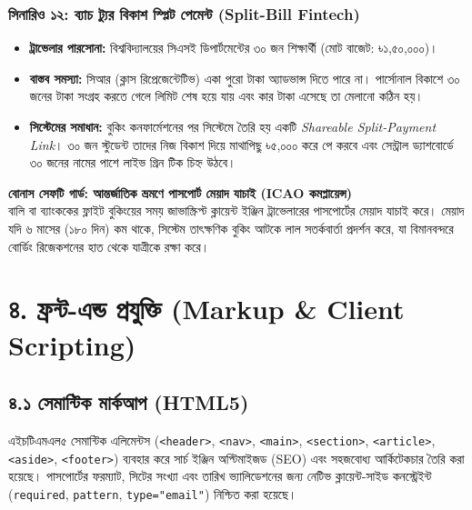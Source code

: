 \documentclass[11pt,a4paper]{article}
\begin{document}
\subsubsection{সিনারিও ১২: ব্যাচ ট্যুর বিকাশ স্প্লিট পেমেন্ট (Split-Bill Fintech)}
\begin{itemize}[leftmargin=*]
    \item \textbf{ট্রাভেলার পারসোনা:} বিশ্ববিদ্যালয়ের সিএসই ডিপার্টমেন্টের ৩০ জন শিক্ষার্থী (মোট বাজেট: ৳১,৫০,০০০)।
    \item \textbf{বাস্তব সমস্যা:} সিআর (ক্লাস রিপ্রেজেন্টেটিভ) একা পুরো টাকা অ্যাডভান্স দিতে পারে না। পার্সোনাল বিকাশে ৩০ জনের টাকা সংগ্রহ করতে গেলে লিমিট শেষ হয়ে যায় এবং কার টাকা এসেছে তা মেলানো কঠিন হয়।
    \item \textbf{সিস্টেমের সমাধান:} বুকিং কনফার্মেশনের পর সিস্টেমে তৈরি হয় একটি \textit{Shareable Split-Payment Link}। ৩০ জন স্টুডেন্ট তাদের নিজ বিকাশ দিয়ে মাথাপিছু ৳৫,০০০ করে পে করবে এবং সেন্ট্রাল ড্যাশবোর্ডে ৩০ জনের নামের পাশে লাইভ গ্রিন টিক চিহ্ন উঠবে।
\end{itemize}

\begin{tcolorbox}[colback=lightgray,colframe=secondary,arc=1mm,boxrule=0.6pt]
\footnotesize\textbf{বোনাস সেফটি গার্ড: আন্তর্জাতিক ভ্রমণে পাসপোর্ট মেয়াদ যাচাই (ICAO কমপ্লায়েন্স)}\\
বালি বা ব্যাংককের ফ্লাইট বুকিংয়ের সময় জাভাস্ক্রিপ্ট ক্লায়েন্ট ইঞ্জিন ট্রাভেলারের পাসপোর্টের মেয়াদ যাচাই করে। মেয়াদ যদি ৬ মাসের (১৮০ দিন) কম থাকে, সিস্টেম তাৎক্ষণিক বুকিং আটকে লাল সতর্কবার্তা প্রদর্শন করে, যা বিমানবন্দরে বোর্ডিং রিজেকশনের হাত থেকে যাত্রীকে রক্ষা করে।
\end{tcolorbox}

\newpage

\section{৪. ফ্রন্ট-এন্ড প্রযুক্তি (Markup \& Client Scripting)}

\subsection{৪.১ সেমান্টিক মার্কআপ (HTML5)}
এইচটিএমএল৫ সেমান্টিক এলিমেন্টস (\texttt{<header>}, \texttt{<nav>}, \texttt{<main>}, \texttt{<section>}, \texttt{<article>}, \texttt{<aside>}, \texttt{<footer>}) ব্যবহার করে সার্চ ইঞ্জিন অপ্টিমাইজড (SEO) এবং সহজবোধ্য আর্কিটেকচার তৈরি করা হয়েছে। পাসপোর্টের ফরম্যাট, সিটের সংখ্যা এবং তারিখ ভ্যালিডেশনের জন্য নেটিভ ক্লায়েন্ট-সাইড কনস্ট্রেইন্ট (\texttt{required}, \texttt{pattern}, \texttt{type="email"}) নিশ্চিত করা হয়েছে।
\end{document}
